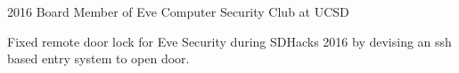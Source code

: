


\vspace{0.3cm}
\begin{cvitems}
\begin{small}
\item{2016 Board Member of Eve Computer Security Club at UCSD}
\item{Fixed remote door lock for Eve Security during SDHacks 2016 by devising an ssh based entry system to open door.}
\end{small}
\end{cvitems}
